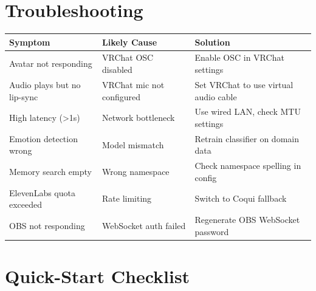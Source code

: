 \documentclass[11pt,letterpaper]{article}
\renewcommand{\arraystretch}{1.3}
\begin{document}
\section{Troubleshooting}

\begin{center}
\renewcommand{\arraystretch}{1.4}
\begin{tabular}{@{}L{4.2cm}L{4.2cm}L{5.2cm}@{}}
\toprule
\textbf{Symptom} & \textbf{Likely Cause} & \textbf{Solution} \\
\midrule
Avatar not responding & VRChat OSC disabled & Enable OSC in VRChat settings \\
Audio plays but no lip-sync & VRChat mic not configured & Set VRChat to use virtual audio cable \\
High latency (>1s) & Network bottleneck & Use wired LAN, check MTU settings \\
Emotion detection wrong & Model mismatch & Retrain classifier on domain data \\
Memory search empty & Wrong namespace & Check namespace spelling in config \\
ElevenLabs quota exceeded & Rate limiting & Switch to Coqui fallback \\
OBS not responding & WebSocket auth failed & Regenerate OBS WebSocket password \\
\bottomrule
\end{tabular}
\end{center}

\section{Quick-Start Checklist}
\end{document}
